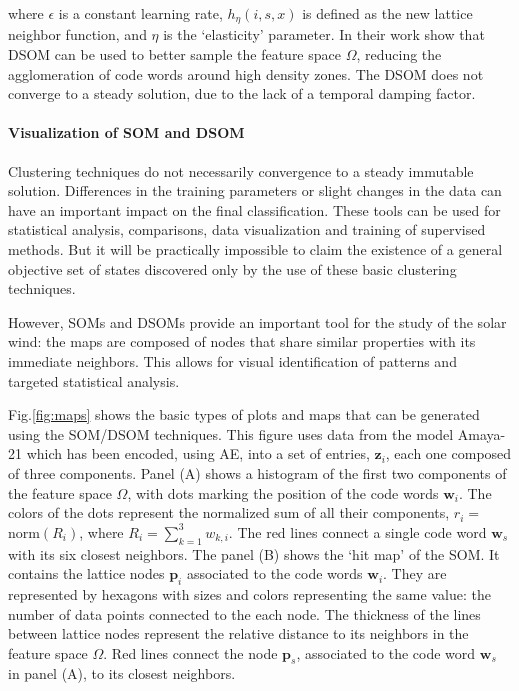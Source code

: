where $\epsilon$ is a constant learning rate, $h_\eta(i,s,x)$ is defined as the new lattice neighbor function, and $\eta$ is the `elasticity' parameter. In their work \citep{Rougier2011} show that DSOM can be used to better sample the feature space $\Omega$, reducing the agglomeration of code words around high density zones. The DSOM does not converge to a steady solution, due to the lack of a temporal damping factor.

\paragraph{Visualization of SOM and DSOM}
Clustering techniques do not necessarily convergence to a steady immutable solution. Differences in the training parameters or slight changes in the data can have an important impact on the final classification. These tools can be used for statistical analysis, comparisons, data visualization and training of supervised methods. But it will be practically impossible to claim the existence of a general objective set of states discovered only by the use of these basic clustering techniques.

However, SOMs and DSOMs provide an important tool for the study of the solar wind: the maps are composed of nodes that share similar properties with its immediate neighbors. This allows for visual identification of patterns and targeted statistical analysis.

Fig.\ref{fig:maps} shows the basic types of plots and maps that can be generated using the SOM/DSOM techniques. This figure uses data from the model Amaya-21 which has been encoded, using AE, into a set of entries, $\boldsymbol{z}_i$, each one composed of three components. Panel (A) shows a histogram of the first two components of the feature space $\Omega$, with dots marking the position of the code words $\boldsymbol{w}_i$. The colors of the dots represent the normalized sum of all their components, $r_i =$ norm$(R_i)$, where $R_i = \sum_{k=1}^3 w_{k,i}$. The red lines connect a single code word $\boldsymbol{w}_s$ with its six closest neighbors. The panel (B) shows the `hit map' of the SOM. It contains the lattice nodes $\boldsymbol{p}_i$ associated to the code words $\boldsymbol{w}_i$. They are represented by hexagons with sizes and colors representing the same value: the number of data points connected to the each node. The thickness of the lines between lattice nodes represent the relative distance to its neighbors in the feature space $\Omega$. Red lines connect the node $\boldsymbol{p}_s$, associated to the code word $\boldsymbol{w}_s$ in panel (A), to its closest neighbors.

